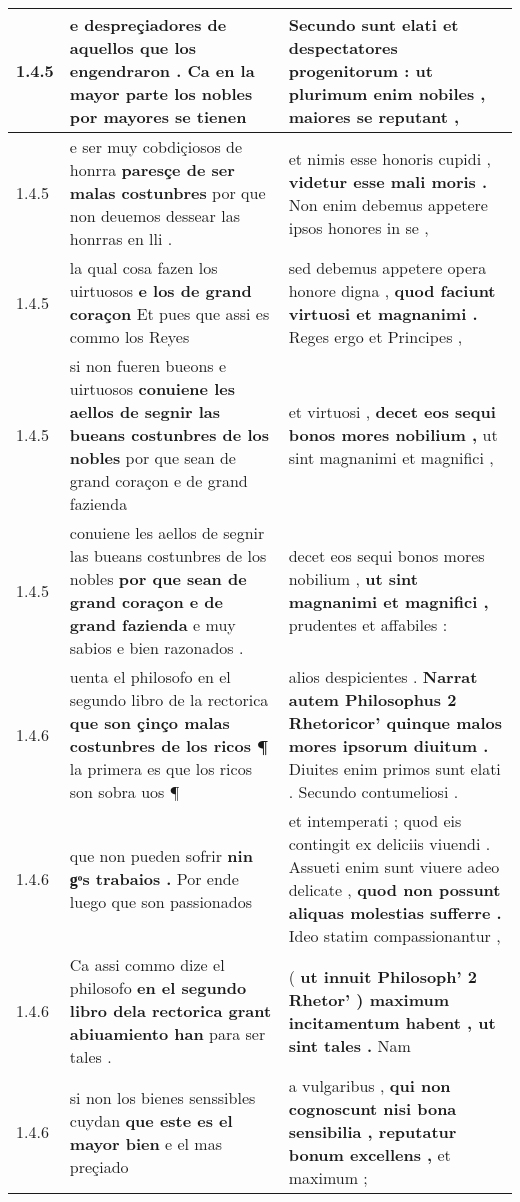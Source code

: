 \begin{tabular}{|p{1cm}|p{6.5cm}|p{6.5cm}|}
1.4.5 & e despreçiadores de aquellos que los engendraron . \textbf{ Ca en la mayor parte los nobles } por mayores se tienen & Secundo sunt elati et despectatores progenitorum : \textbf{ ut plurimum enim nobiles , } maiores se reputant , \\\hline
1.4.5 & e ser muy cobdiçiosos de honrra \textbf{ paresçe de ser malas costunbres } por que non deuemos dessear las honrras en lli . & et nimis esse honoris cupidi , \textbf{ videtur esse mali moris . } Non enim debemus appetere ipsos honores in se , \\\hline
1.4.5 & la qual cosa fazen los uirtuosos \textbf{ e los de grand coraçon } Et pues que assi es commo los Reyes & sed debemus appetere opera honore digna , \textbf{ quod faciunt virtuosi et magnanimi . } Reges ergo et Principes , \\\hline
1.4.5 & si non fueren bueons e uirtuosos \textbf{ conuiene les aellos de segnir las bueans costunbres de los nobles } por que sean de grand coraçon e de grand fazienda & et virtuosi , \textbf{ decet eos sequi bonos mores nobilium , } ut sint magnanimi et magnifici , \\\hline
1.4.5 & conuiene les aellos de segnir las bueans costunbres de los nobles \textbf{ por que sean de grand coraçon e de grand fazienda } e muy sabios e bien razonados . & decet eos sequi bonos mores nobilium , \textbf{ ut sint magnanimi et magnifici , } prudentes et affabiles : \\\hline
1.4.6 & uenta el philosofo en el segundo libro de la rectorica \textbf{ que son çinço malas costunbres de los ricos ¶ } la primera es que los ricos son sobra uos ¶ & alios despicientes . \textbf{ Narrat autem Philosophus 2 Rhetoricor’ quinque malos mores ipsorum diuitum . } Diuites enim primos sunt elati . Secundo contumeliosi . \\\hline
1.4.6 & que non pueden sofrir \textbf{ nin gͦs trabaios . } Por ende luego que son passionados & et intemperati ; quod eis contingit ex deliciis viuendi . Assueti enim sunt viuere adeo delicate , \textbf{ quod non possunt aliquas molestias sufferre . } Ideo statim compassionantur , \\\hline
1.4.6 & Ca assi commo dize el philosofo \textbf{ en el segundo libro dela rectorica grant abiuamiento han } para ser tales . & ( \textbf{ ut innuit Philosoph’ 2 Rhetor’ ) maximum incitamentum habent , ut sint tales . } Nam \\\hline
1.4.6 & si non los bienes senssibles cuydan \textbf{ que este es el mayor bien } e el mas preçiado & a vulgaribus , \textbf{ qui non cognoscunt nisi bona sensibilia , reputatur bonum excellens , } et maximum ; \\\hline

\end{tabular}
